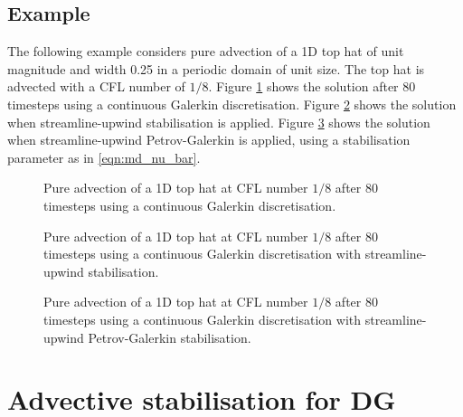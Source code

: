 \subsection{Example}

The following example considers pure advection of a 1D top hat of unit magnitude
and width 0.25 in a periodic domain of unit size. The top hat is advected with a
CFL number of $1 / 8$. Figure \ref{fig:top_hat_cg} shows the solution after
80 timesteps using a continuous Galerkin discretisation. Figure \ref{fig:top_hat_su}
shows the solution when streamline-upwind stabilisation is applied.
Figure \ref{fig:top_hat_supg} shows the solution when streamline-upwind
Petrov-Galerkin is applied, using a stabilisation parameter as in \eqref{eqn:md_nu_bar}.

\begin{figure}[ht]
  \centering
  \caption{Pure advection of a 1D top hat at CFL number $1 / 8$ after 80 timesteps
           using a continuous Galerkin discretisation.}
  \label{fig:top_hat_cg}
\end{figure}

\begin{figure}[ht]
  \centering
  \caption{Pure advection of a 1D top hat at CFL number $1 / 8$ after 80 timesteps
           using a continuous Galerkin discretisation with streamline-upwind
           stabilisation.}
  \label{fig:top_hat_su}
\end{figure}

\begin{figure}[ht]
  \centering
  \caption{Pure advection of a 1D top hat at CFL number $1 / 8$ after 80 timesteps
           using a continuous Galerkin discretisation with streamline-upwind
           Petrov-Galerkin stabilisation.}
  \label{fig:top_hat_supg}
\end{figure}

\section{Advective stabilisation for DG}

